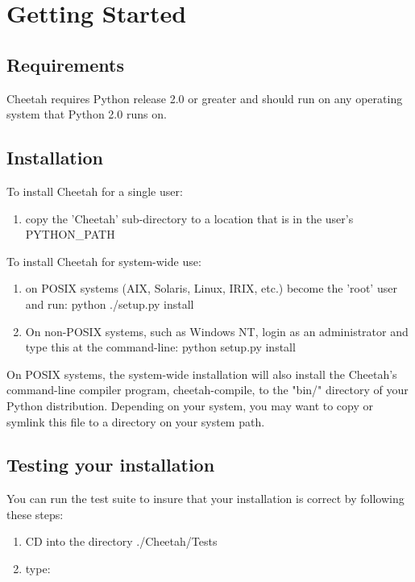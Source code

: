 \section{Getting Started}
\label{gettingStarted}

\subsection{Requirements}
Cheetah requires Python release 2.0 or greater and should run on any
operating system that Python 2.0 runs on.

\subsection{Installation}

To install Cheetah for a single user:
\begin{enumerate}
\item copy the 'Cheetah' sub-directory  to a location that is in the user's
     PYTHON_PATH
\end{enumerate}

To install Cheetah for system-wide use:
\begin{enumerate}
\item on POSIX systems (AIX, Solaris, Linux, IRIX, etc.) become the 'root' user
     and run: python ./setup.py install
     
\item On non-POSIX systems, such as Windows NT, login as an administrator and
     type this at the command-line:  python setup.py install
\end{enumerate}


On POSIX systems, the system-wide installation will also install the Cheetah's
command-line compiler program, cheetah-compile, to the "bin/" directory of your
Python distribution.  Depending on your system, you may want to copy or symlink
this file to a directory on your system path.

\subsection{Testing your installation}
You can run the test suite to insure that your installation is correct by
following these steps:
\begin{enumerate}
\item CD into the directory ./Cheetah/Tests   
\item type:  
\end{enumerate}

